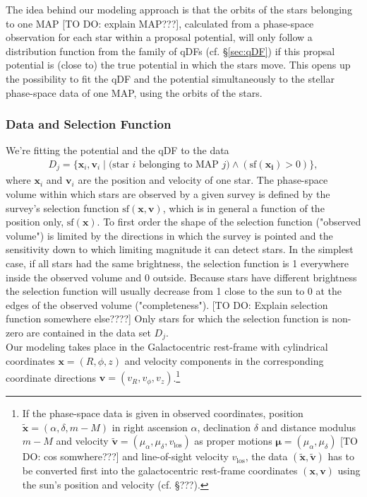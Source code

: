 \documentclass[12pt,preprint]{aastex}
\newcommand{\vect}[1]{\boldsymbol{#1}} %
\begin{document}
The idea behind our modeling approach is that the orbits of the stars belonging to one MAP [TO DO: explain MAP???], calculated from a phase-space observation for each star within a proposal potential,  will only follow a distribution function from the family of qDFs (cf. \S\ref{sec:qDF}) if this propsal potential is (close to) the true potential in which the stars move. This opens up the possibility to fit the qDF and the potential simultaneously to the stellar phase-space data of one MAP, using the orbits of the stars. 

\subsubsection{Data and Selection Function} 

We're fitting the potential and the qDF to the data
\begin{eqnarray*}
D_j  =\{ \vect{x}_i,\vect{v}_i \mid \text{(star $i$ belonging to MAP $j$)} \wedge (\text{sf}(\vect{x_i}) > 0) \},
\end{eqnarray*}
where  $\vect{x}_i$ and $\vect{v}_i$ are the position and velocity of one star. The phase-space volume within which stars are observed by a given survey is defined by the survey's selection function $\text{sf}(\vect{x},\vect{v})$, which is in general a function of the position only, $\text{sf}(\vect{x})$. To first order the shape of the selection function ("observed volume") is limited by the directions in which the survey is pointed and the sensitivity down to which limiting magnitude it can detect stars. In the simplest case, if all stars had the same brightness, the selection function is 1 everywhere inside the observed volume and 0 outside. Because stars have different brightness the selection function will usually decrease from 1 close to the sun to 0 at the edges of the observed volume ("completeness"). [TO DO: Explain selection function somewhere else????] Only stars for which the selection function is non-zero are contained in the data set $D_j$.
\\Our modeling takes place in the Galactocentric rest-frame with cylindrical coordinates $\vect{x} = (R,\phi,z)$ and velocity components in the corresponding coordinate directions $\vect{v} = (v_R,v_\phi,v_z)$.\footnote{If the phase-space data is given in observed coordinates, position $\tilde{\vect{x}}=(\alpha,\delta,m-M)$ in right ascension $\alpha$, declination $\delta$ and distance modulus $m-M$ and velocity $\tilde{\vect{v}} = (\mu_\alpha,\mu_\delta,v_\text{los})$ as proper motions $\vect{\mu}=(\mu_\alpha,\mu_\delta)$ [TO DO: cos somwhere???] and line-of-sight velocity $v_\text{los}$, the data $(\tilde{\vect{x}},\tilde{\vect{v}})$ has to be converted first into the galactocentric rest-frame coordinates $(\vect{x},\vect{v})$ using the sun's position and velocity (cf. \S ???).}
\end{document}
